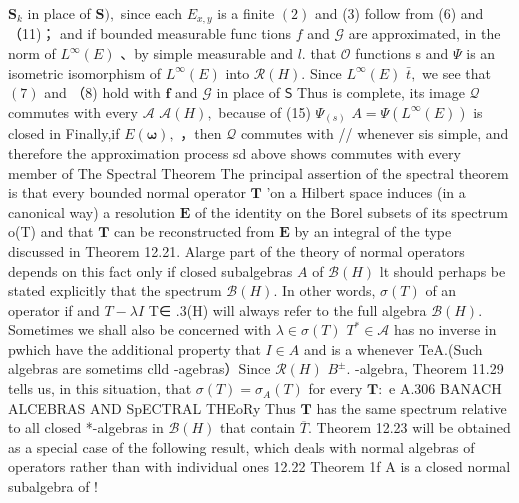 $\mathbf{S}_{k}$ in place of ${\boldsymbol{S}}),$ since each $E_{x,y}$ is a finite $\left(2\right)$ and (3) follow from (6) and （11)； and if bounded measurable func tions $\boldsymbol{\mathit{f}}$ and $\scriptstyle{\mathcal{G}}$ are approximated, in the norm of $L^{\infty}(E)$ 、by simple measurable and ${\mathit{l}}.$ that ${\mathcal{O}}$ functions s and $\Psi$ is an isometric isomorphism of $L^{\infty}(E)$ into ${\mathcal{R}}(H).$ Since $L^{\infty}(E)$ ${\bar{t}},$ we see that $(7)$ and （8) hold with $\boldsymbol{f}$ and $\textstyle{\mathcal{G}}$ in place of $\boldsymbol{\mathsf{S}}$ Thus is complete, its image ${\mathcal{Q}}$ commutes with every $\textstyle{\mathcal{A}}$ ${\mathcal{A}}(H),$ because of (15) $\Psi_{(s)}$ $A=\Psi(L^{\infty}(E))$ is closed in Finally,if $E({\boldsymbol{\omega}}),$ ，then $\textstyle{\mathcal{Q}}$ commutes with // whenever sis simple, and therefore the approximation process sd above shows commutes with every member of The Spectral Theorem The principal assertion of the spectral theorem is that every bounded normal operator ${\boldsymbol{T}}$ 'on a Hilbert space induces (in a canonical way) a resolution ${\boldsymbol{E}}$ of the identity on the Borel subsets of its spectrum o(T) and that ${\boldsymbol{T}}$ can be reconstructed from ${\boldsymbol{E}}$ by an integral of the type discussed in Theorem 12.21. Alarge part of the theory of normal operators depends on this fact only if closed subalgebras $\textstyle A$ of ${\mathcal{B}}(H)$ lt should perhaps be stated explicitly that the spectrum ${\mathcal{B}}(H).$ In other words, $\sigma(T)$ of an operator if and $T-\lambda I$ T∈ .3(H) will always refer to the full algebra ${\mathcal{B}}(H).$ Sometimes we shall also be concerned with $\lambda\in\sigma(T)$ $T^{*}\in{\mathcal{A}}$ has no inverse in pwhich have the additional property that $\scriptstyle I\in A$ and is a whenever TeA.(Such algebras are sometims clld -agebras）Since ${\mathcal{R}}(H)$ $B^{\pm}.$ -algebra, Theorem 11.29 tells us, in this situation, that $\sigma(T)=\sigma_{A}(T)$ for every ${\boldsymbol{T}}:$ e A.306 BANACH ALCEBRAS AND SpECTRAL THEoRy Thus ${\boldsymbol{T}}$ has the same spectrum relative to all closed *-algebras in ${\mathcal{B}}(H)$ that contain ${\overline{{T}}}.$ Theorem 12.23 will be obtained as a special case of the following result, which deals with normal algebras of operators rather than with individual ones 12.22 Theorem 1f A is a closed normal subalgebra of !%